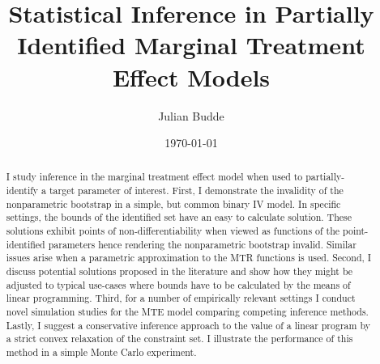 \documentclass[12pt,a4paper,english]{article} %
\title{Statistical Inference in Partially Identified Marginal Treatment Effect Models}
\author{Julian Budde}
\date{\today}
\numberwithin{equation}{section}
\theoremstyle{definition}
\theoremstyle{remark}
\theoremstyle{plain}
\begin{document}
\maketitle

\begin{abstract}
	I study inference in the marginal treatment effect model when used to partially-identify a target parameter of interest.
	First, I demonstrate the invalidity of the nonparametric bootstrap in a simple, but common binary IV model.
	In specific settings, the bounds of the identified set have an easy to calculate solution.
	These solutions exhibit points of non-differentiability when viewed as functions of the point-identified parameters hence rendering the nonparametric bootstrap invalid.
	Similar issues arise when a parametric approximation to the MTR functions is used.
  Second, I discuss potential solutions proposed in the literature and show how they might be adjusted to typical use-cases where bounds have to be calculated by the means of linear programming.
	Third, for a number of empirically relevant settings I conduct novel simulation studies for the MTE model comparing competing inference methods.
  Lastly, I suggest a conservative inference approach to the value of a linear program by a strict convex relaxation of the constraint set.
  I illustrate the performance of this method in a simple Monte Carlo experiment.
\end{abstract}

\clearpage
\newpage

\tableofcontents

\clearpage
\newpage

\listoftables

\clearpage
\newpage

\listoffigures

\clearpage
\newpage
\end{document}
